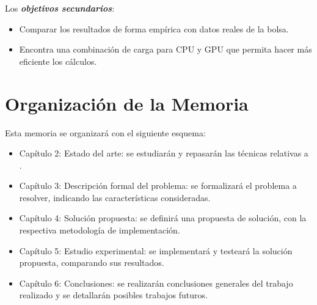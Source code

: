 Los \emph{\textbf{objetivos secundarios}}:
\begin{itemize}
	\item Comparar los resultados de forma empírica con datos reales de la bolsa.
	\item Encontra una combinación de carga para CPU y GPU que permita hacer más eficiente los cálculos.
\end{itemize}

\section{Organización de la Memoria}

Esta memoria se organizará con el siguiente esquema:
\begin{itemize}
	\item Capítulo 2: Estado del arte: se estudiarán y repasarán las técnicas relativas a .
	\item Capítulo 3: Descripción formal del problema: se formalizará el problema a resolver, indicando las características consideradas.
	\item Capítulo 4: Solución propuesta: se definirá una propuesta de solución, con la respectiva metodología de implementación. 
	\item Capítulo 5: Estudio experimental: se implementará y testeará la solución propuesta, comparando sus resultados.
	\item Capítulo 6: Conclusiones: se realizarán conclusiones generales del trabajo realizado y se detallarán posibles trabajos futuros.
\end{itemize}
